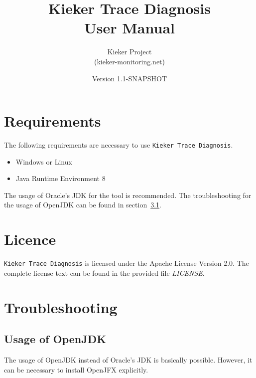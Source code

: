 \documentclass{article}
\title{Kieker Trace Diagnosis\\User Manual}
\date{Version 1.1-SNAPSHOT}
\author{Kieker Project\\(kieker-monitoring.net)}
\begin{document}
  \newcommand{\KiekerTraceDiagnosis}[0]{\texttt{Kieker Trace Diagnosis}}
  \newcommand{\file}[1]{\textit{#1}}

  \maketitle

  \section{Requirements}
  The following requirements are necessary to use \KiekerTraceDiagnosis{}.
  \begin{itemize}
    \item Windows or Linux
    \item Java Runtime Environment 8
  \end{itemize}
  The usage of Oracle's JDK for the tool is recommended. The troubleshooting for the usage of OpenJDK can be found in section~\ref{OpenJDK}.

  \section{Licence}
  \KiekerTraceDiagnosis{} is licensed under the Apache License Version 2.0. The complete license text can be found in the provided file \file{LICENSE}.

  \section{Troubleshooting}

  \subsection{Usage of OpenJDK}\label{OpenJDK}
  The usage of OpenJDK instead of Oracle's JDK is basically possible. However, it can be necessary to install OpenJFX explicitly.
\end{document}
